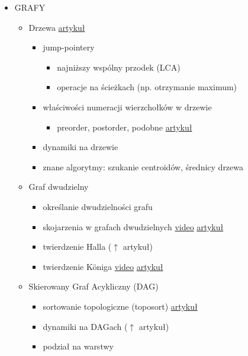 \documentclass[15pt]{article}
\begin{document}
\begin{itemize}
    \item GRAFY
    \begin{itemize}
        \item Drzewa \href{http://kompendium.meetit.pl/kurs#graph3}{artykuł}
        \begin{itemize}
            \item jump-pointery
            \begin{itemize}
                \item najniższy wspólny przodek (LCA)
                \item operacje na ścieżkach (np. otrzymanie maximum)
            \end{itemize}
            \item właściwości numeracji wierzchołków w drzewie
            \begin{itemize}
                \item preorder, postorder, podobne \href{http://kompendium.meetit.pl/kurs#graph5}{artykuł}
            \end{itemize}
            \item dynamiki na drzewie
            \item znane algorytmy: szukanie centroidów, średnicy drzewa
        \end{itemize}
        
        \item Graf dwudzielny
        \begin{itemize}
            \item określanie dwudzielności grafu
            \item skojarzenia w grafach dwudzielnych \href{http://solve.edu.pl/~sparingi/resources}{video} \href{http://kompendium.meetit.pl/kurs#graph9}{artykuł}
            \item twierdzenie Halla ($\uparrow$ artykuł)
            \item twierdzenie K\"{o}niga \href{http://solve.edu.pl/~sparingi/resources}{video} \href{http://www.deltami.edu.pl/temat/matematyka/teoria_grafow/2013/10/31/W_grafach_dwudzielnych_jest_latwiej/}{artykuł}
        \end{itemize}
        
        \item Skierowany Graf Acykliczny (DAG)
        \begin{itemize}
            \item sortowanie topologiczne (toposort) \href{http://kompendium.meetit.pl/kurs#graphB}{artykuł}
            \item dynamiki na DAGach ($\uparrow$ artykuł)
            \item podział na warstwy
        \end{itemize}
        

\end{itemize}
\end{itemize}
\end{document}

